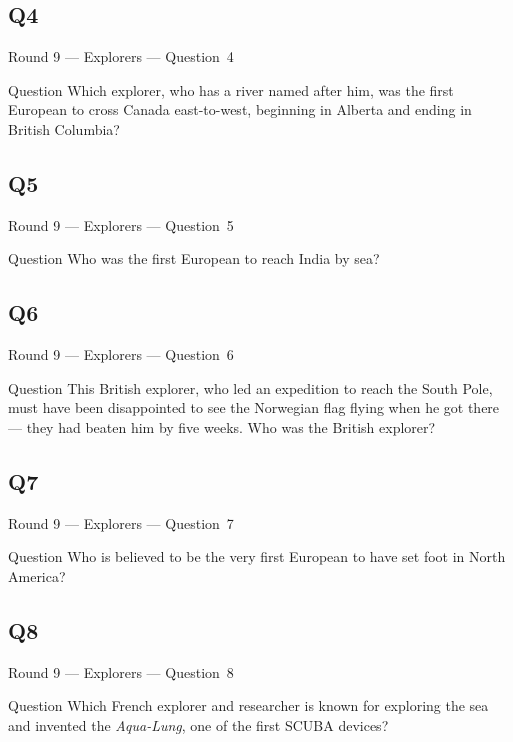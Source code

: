 \documentclass[11pt]{beamer}
\begin{document}
\subsection*{Q4}
\begin{frame}[t]{Round 9 --- Explorers --- \mbox{Question 4}}
\begin{block}{Question}
Which explorer, who has a river named after him, was the first European to cross Canada east-to-west, beginning in Alberta and ending in British Columbia?
\end{block}
\end{frame}
\subsection*{Q5}
\begin{frame}[t]{Round 9 --- Explorers --- \mbox{Question 5}}
\begin{block}{Question}
Who was the first European to reach India by sea?
\end{block}
\end{frame}
\subsection*{Q6}
\begin{frame}[t]{Round 9 --- Explorers --- \mbox{Question 6}}
\begin{block}{Question}
This British explorer, who led an expedition to reach the South Pole, must have been disappointed to see the Norwegian flag flying when he got there --- they had beaten him by five weeks. Who was the British explorer?
\end{block}
\end{frame}
\subsection*{Q7}
\begin{frame}[t]{Round 9 --- Explorers --- \mbox{Question 7}}
\begin{block}{Question}
Who is believed to be the very first European to have set foot in North America?
\end{block}
\end{frame}
\subsection*{Q8}
\begin{frame}[t]{Round 9 --- Explorers --- \mbox{Question 8}}
\begin{block}{Question}
Which French explorer and researcher is known for exploring the sea and invented the \emph{Aqua-Lung}, one of the first SCUBA devices?
\end{block}
\end{frame}
\end{document}
